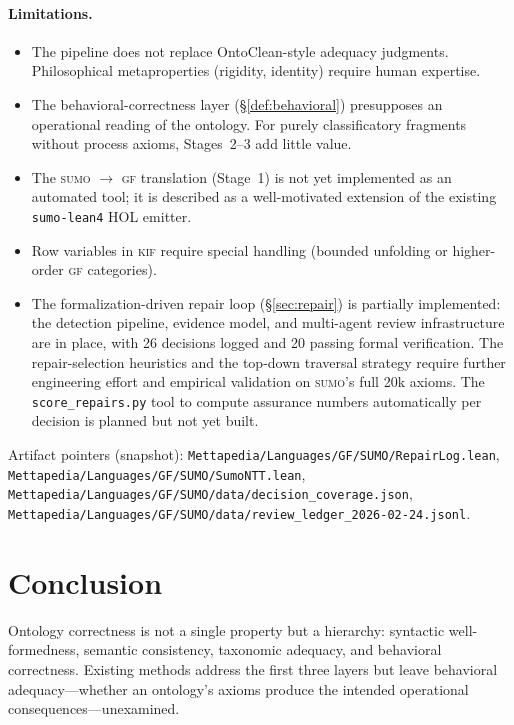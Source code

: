 \documentclass[11pt]{article}
\newcommand{\KIF}{\textsc{kif}}
\newcommand{\SUMO}{\textsc{sumo}}
\newcommand{\GF}{\textsc{gf}}
\theoremstyle{definition}
\theoremstyle{plain}
\begin{document}
\paragraph{Limitations.}
\begin{itemize}[nosep]
  \item The pipeline does not replace OntoClean-style adequacy
    judgments.  Philosophical metaproperties (rigidity, identity)
    require human expertise.
  \item The behavioral-correctness layer (\S\ref{def:behavioral})
    presupposes an operational reading of the ontology.  For purely
    classificatory fragments without process axioms, Stages~2--3
    add little value.
  \item The \SUMO{} $\to$ \GF{} translation (Stage~1) is not yet
    implemented as an automated tool; it is described as a
    well-motivated extension of the existing \texttt{sumo-lean4}
    HOL emitter.
  \item Row variables in \KIF{} require special handling (bounded
    unfolding or higher-order \GF{} categories).
  \item The formalization-driven repair loop (\S\ref{sec:repair}) is
    partially implemented: the detection pipeline, evidence model,
    and multi-agent review infrastructure are in place, with 26
    decisions logged and 20 passing formal verification.  The
    repair-selection heuristics and the top-down traversal strategy
    require further engineering effort and empirical validation on
    \SUMO{}'s full 20k axioms.  The \texttt{score\_repairs.py}
    tool to compute assurance numbers automatically per decision
    is planned but not yet built.
\end{itemize}
Artifact pointers (snapshot): \texttt{Mettapedia/Languages/GF/SUMO/RepairLog.lean},
\texttt{Mettapedia/Languages/GF/SUMO/SumoNTT.lean},
\texttt{Mettapedia/Languages/GF/SUMO/data/decision\_coverage.json},
\texttt{Mettapedia/Languages/GF/SUMO/data/review\_ledger\_2026-02-24.jsonl}.

\section{Conclusion}
\label{sec:conclusion}

Ontology correctness is not a single property but a hierarchy:
syntactic well-formedness, semantic consistency, taxonomic adequacy,
and behavioral correctness.
Existing methods address the first three layers but leave behavioral
adequacy---whether an ontology's axioms produce the intended
operational consequences---unexamined.
\end{document}
